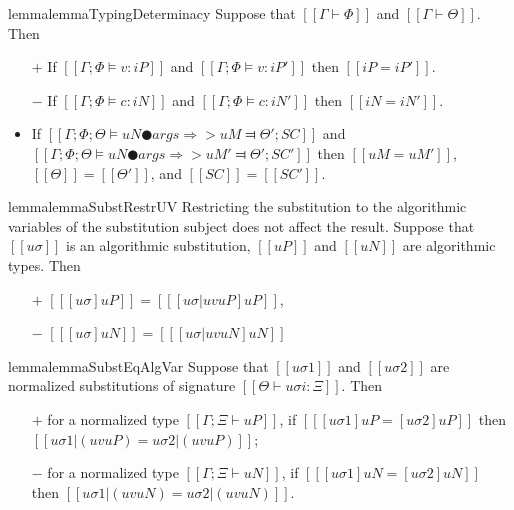 \begin{restatable}{lemma}{lemmaTypingDeterminacy}
    \label{lemma:typing-determinacy}
    Suppose that $[[Γ ⊢ Φ]]$ and $[[Γ ⊢ Θ]]$. Then 
    \begin{itemize}
        \item [$+$] If $[[Γ; Φ ⊨ v : iP]]$ and $[[Γ; Φ ⊨ v : iP']]$ then $[[iP = iP']]$.
        \item [$-$] If $[[Γ; Φ ⊨ c : iN]]$ and $[[Γ; Φ ⊨ c : iN']]$ then $[[iN = iN']]$.
        \item If $[[Γ; Φ; Θ ⊨ uN ● args ⇒> uM ⫤ Θ'; SC]]$ and 
            $[[Γ; Φ; Θ ⊨ uN ● args ⇒> uM' ⫤ Θ'; SC']]$ then 
            $[[uM = uM']]$, $[[Θ]] = [[Θ']]$, and $[[SC]] =[[SC']]$.  
    \end{itemize}
\end{restatable}

\begin{restatable}{lemma}{lemmaSubstRestrUV}
    \label{lemma:subst-restr-uv}
    Restricting the substitution to the algorithmic 
    variables of the
    substitution subject does not affect the result.
    Suppose that $[[uσ]]$ is an algorithmic substitution,
    $[[uP]]$ and $[[uN]]$ are algorithmic types. Then
 \begin{itemize}
        \item[$+$] $[[ [uσ]uP ]] = [[ [uσ|uv uP]uP ]]$,
        \item[$-$] $[[ [uσ]uN ]] = [[ [uσ|uv uN]uN ]]$
    \end{itemize}
\end{restatable}

\begin{restatable}{lemma}{lemmaSubstEqAlgVar}
    \label{lemma:subst-eq-algovar}
    Suppose that $[[uσ1]]$ and $[[uσ2]]$ are 
    normalized substitutions of signature $[[Θ ⊢ uσi : Ξ]]$.
    Then 
    \begin{enumerate}
        \item [$+$] for a normalized type $[[Γ; Ξ ⊢ uP]]$, if $[[ [uσ1]uP = [uσ2]uP ]]$ then
            $[[uσ1|(uv uP)  = uσ2|(uv uP)]]$;
        \item [$-$] for a normalized type $[[Γ; Ξ ⊢ uN]]$, if $[[ [uσ1]uN = [uσ2]uN ]]$ then
            $[[uσ1|(uv uN)  = uσ2|(uv uN)]]$.
    \end{enumerate}
\end{restatable}


